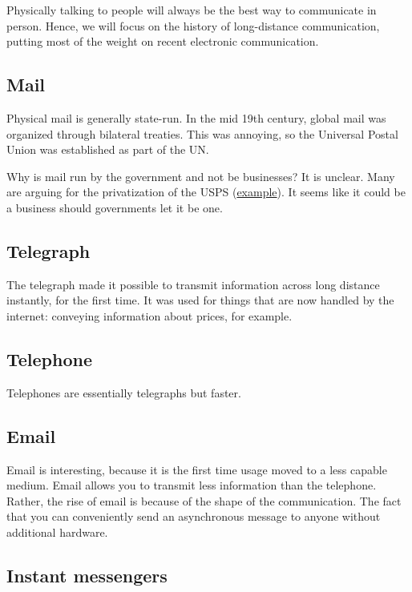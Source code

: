 \documentclass[sigconf, nonacm, balance=false, natbib=false]{acmart}
\begin{document}
Physically talking to people will always be the best way to communicate in person. Hence, we will focus on the history of long-distance communication, putting most of the weight on recent electronic communication.

\subsection{Mail}

Physical mail is generally state-run. In the mid 19th century, global mail was organized through bilateral treaties. This was annoying, so the Universal Postal Union was established as part of the UN.

Why is mail run by the government and not be businesses? It is unclear. Many are arguing for the privatization of the USPS (\href{https://fee.org/articles/the-postal-monopoly/}{example}). It seems like it could be a business should governments let it be one.

\subsection{Telegraph}

The telegraph made it possible to transmit information across long distance instantly, for the first time. It was used for things that are now handled by the internet: conveying information about prices, for example.

\subsection{Telephone}

Telephones are essentially telegraphs but faster.

\subsection{Email}

Email is interesting, because it is the first time usage moved to a less capable medium. Email allows you to transmit less information than the telephone. Rather, the rise of email is because of the shape of the communication. The fact that you can conveniently send an asynchronous message to anyone without additional hardware.

\subsection{Instant messengers}
\end{document}
